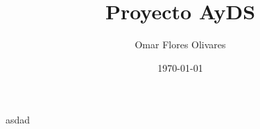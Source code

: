 \documentclass[12pt,letterpaper]{article}
\title{\textbf{Proyecto AyDS}}
\author{Omar Flores Olivares}
\date{\today}
\begin{document}
\maketitle
\newpage
asdad
\end{document}

